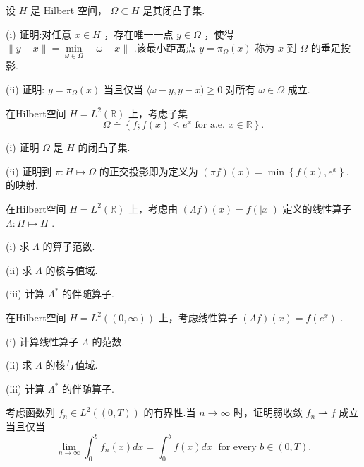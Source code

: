 \begin{rbhw}
设 $H$ 是 Hilbert 空间， $\Omega  \subset  H$ 是其闭凸子集.

(i) 证明:对任意 $x \in  H$ ，存在唯一一点 $y \in  \Omega$ ，使得 $\| y - x\|  = \mathop{\min }\limits_{{\omega  \in  \Omega }}\| \omega  - x\|$ .该最小距离点 $y = {\pi }_{\Omega }\left( x\right)$ 称为 $x$ 到 $\Omega$ 的垂足投影.

(ii) 证明: $y = {\pi }_{\Omega }\left( x\right)$ 当且仅当 $\langle \omega  - y,y - x) \geq  0$ 对所有 $\omega  \in  \Omega$ 成立.
\end{rbhw}

\begin{rbhw}
在Hilbert空间 $H = {L}^{2}\left( \mathbb{R}\right)$ 上，考虑子集
\[
\Omega  \doteq  \left\{  {f;f\left( x\right)  \leq  {e}^{x}\text{ for a.e. }x \in  \mathbb{R}}\right\}  .
\]

(i) 证明 $\Omega$ 是 $H$ 的闭凸子集.

(ii) 证明到 $\pi  : H \mapsto  \Omega$ 的正交投影即为定义为 $\left( {\pi f}\right) \left( x\right)  = \min \left\{  {f\left( x\right) ,{e}^{x}}\right\}  .$ 的映射.
\end{rbhw}

\begin{rbhw}
在Hilbert空间 $H = {L}^{2}\left( \mathbb{R}\right)$ 上，考虑由 $\left( {\Lambda f}\right) \left( x\right)  = f\left( \left| x\right| \right)$ 定义的线性算子 $\Lambda  : H \mapsto  H$ .

(i) 求 $\Lambda$ 的算子范数.

(ii) 求 $\Lambda$ 的核与值域.

(iii) 计算 ${\Lambda }^{ * }$ 的伴随算子.
\end{rbhw}

\begin{rbhw}
在Hilbert空间 $H = {L}^{2}\left( \left(  {0,\infty }\right)  \right)$ 上，考虑线性算子 $\left( {\Lambda f}\right) \left( x\right)  = f\left( {e}^{x}\right)$ .

(i) 计算线性算子 $\Lambda$ 的范数.

(ii) 求 $\Lambda$ 的核与值域.

(iii) 计算 ${\Lambda }^{ * }$ 的伴随算子.
\end{rbhw}

\begin{rbhw}
考虑函数列 ${f}_{n} \in  {L}^{2}\left( \left(  {0,T}\right)  \right)$ 的有界性.当 $n \rightarrow  \infty$ 时，证明弱收敛 ${f}_{n} \rightharpoonup  f$ 成立当且仅当
\[
\mathop{\lim }\limits_{{n \rightarrow  \infty }}{\int }_{0}^{b}{f}_{n}\left( x\right) {dx} = {\int }_{0}^{b}f\left( x\right) {dx}\;\text{ for every }b \in  \left(  {0,T}\right)  .
\]
\end{rbhw}

